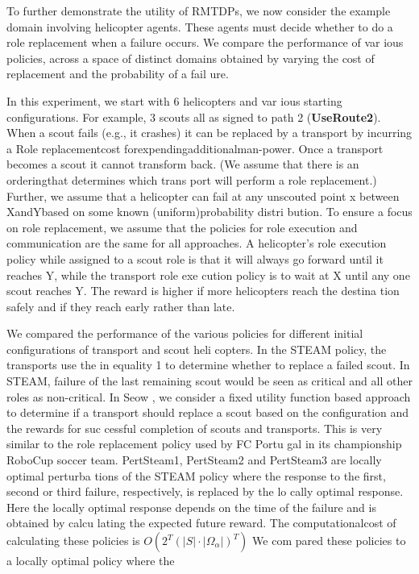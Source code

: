 \documentclass{IEEEtran}
\begin{document}
 To further demonstrate the utility of RMTDPs, we now
 consider the example domain involving helicopter agents.
 These agents must decide whether to do a role replacement
 when a failure occurs. We compare the performance of var
ious policies, across a space of distinct domains obtained by
 varying the cost of replacement and the probability of a fail
ure.

 In this experiment, we start with 6 helicopters and var
ious starting configurations. For example, 3 scouts all as
signed to path 2 (\textbf{UseRoute2}). When a scout fails (e.g., it
 crashes) it can be replaced by a transport by incurring a Role
 replacementcost forexpendingadditionalman-power. Once
 a transport becomes a scout it cannot transform back. (We
 assume that there is an orderingthat determines which trans
port will perform a role replacement.) Further, we assume
 that a helicopter can fail at any unscouted point x between
 XandYbased on some known (uniform)probability distri
bution. To ensure a focus on role replacement, we assume
 that the policies for role execution and communication are
 the same for all approaches. A helicopter's role execution
 policy while assigned to a scout role is that it will always
 go forward until it reaches Y, while the transport role exe
cution policy is to wait at X until any one scout reaches Y.
 The reward is higher if more helicopters reach the destina
tion safely and if they reach early rather than late.

 We compared the performance of the various policies for
 different initial configurations of transport and scout heli
copters. In the STEAM policy, the transports use the in
equality 1 to determine whether to replace a failed scout.
 In STEAM, failure of the last remaining scout would be
 seen as critical and all other roles as non-critical. In Seow
 \cite{Seow} , we consider a fixed utility function
 based approach to determine if a transport should replace a
 scout based on the configuration and the rewards for suc
cessful completion of scouts and transports. This is very
 similar to the role replacement policy used by FC Portu
gal in its championship RoboCup soccer team. PertSteam1,
 PertSteam2 and PertSteam3 are locally optimal perturba
tions of the STEAM policy where the response to the first,
 second or third failure, respectively, is replaced by the lo
cally optimal response. Here the locally optimal response
 depends on the time of the failure and is obtained by calcu
lating the expected future reward. The computationalcost of
 calculating these policies is $O(2^T(|S|\cdot|\Omega_\alpha|)^T)$ We com
pared these policies to a locally optimal policy where the
\end{document}
